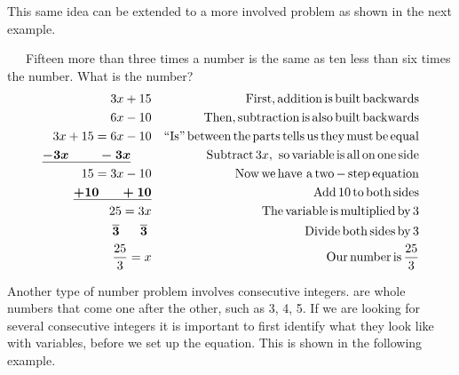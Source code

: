  This same idea can be extended to a more involved problem as shown in the next
example.\pp

\begin{example}\label{Lin75}~~~Fifteen more than three times a number is the same as ten less than six
  times the number. What is the number?
  \begin{eqnarray*}
    3 x + 15 &  & \operatorname{First}, \operatorname{addition} \operatorname{is} \operatorname{built}
    \operatorname{backwards}\\
    6 x - 10 &  & \operatorname{Then}, \operatorname{subtraction} \operatorname{is} \operatorname{also}
    \operatorname{built} \operatorname{backwards}\\
    3 x + 15 = 6 x - 10 &  & \operatorname{``Is''} \operatorname{between} \operatorname{the} \operatorname{parts}
    \operatorname{tells} \operatorname{us} \operatorname{they} \operatorname{must} \operatorname{be} \operatorname{equal}\\
    \boldsymbol{\underline{- 3 x ~~~~~~~- 3 x}}~~~~~ &  & \operatorname{Subtract} 3 x, \operatorname{~so}
    \operatorname{variable} \operatorname{is} \operatorname{all} \operatorname{on} \operatorname{one} \operatorname{side}\\
    15 = 3 x - 10 &  & \operatorname{Now} \operatorname{we} \operatorname{have~a} \operatorname{two} -
    \operatorname{step} \operatorname{equation}\\
    \boldsymbol{\underline{+ 10 ~~~~~+ 10}} &  & \operatorname{Add} 10 \operatorname{to} \operatorname{both}
    \operatorname{sides}\\
    25 = 3 x &  & \operatorname{The} \operatorname{variable} \operatorname{is} \operatorname{multiplied}
    \operatorname{by} 3\\
    \boldsymbol{\overline{3} ~~~~~ \overline{3}}~ &  & \operatorname{Divide} \operatorname{both}
    \operatorname{sides} \operatorname{by} 3\\
    \frac{25}{3} = x &  & \operatorname{Our} \operatorname{number} \operatorname{is} \frac{25}{3}
  \end{eqnarray*}
\end{example}

 Another type of number problem involves consecutive integers.
{} are whole numbers that come one after the other,
such as 3, 4, 5. If we are looking for several consecutive integers it is
important to first identify what they look like with variables, before we set
up the equation. This is shown in the following example.\pp

